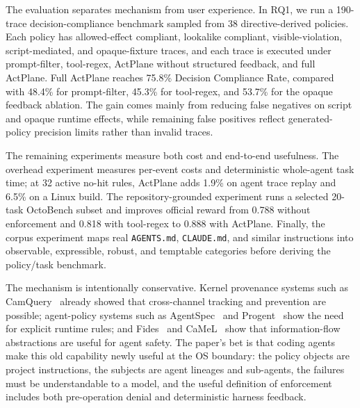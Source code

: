 \documentclass[sigplan,10pt]{acmart}
\begin{document}
The evaluation separates mechanism from user experience. In RQ1, we run a
190-trace decision-compliance benchmark sampled from 38 directive-derived policies. Each
policy has allowed-effect compliant, lookalike compliant, visible-violation,
script-mediated, and opaque-fixture traces, and each trace is executed under
prompt-filter, tool-regex, ActPlane without structured feedback, and full
ActPlane. Full ActPlane reaches 75.8\% Decision Compliance Rate, compared
with 48.4\% for prompt-filter, 45.3\% for tool-regex, and 53.7\% for the opaque
feedback ablation. The gain comes mainly from reducing false negatives on
script and opaque runtime effects, while remaining false positives reflect
generated-policy precision limits rather than invalid traces.

The remaining experiments measure both cost and end-to-end usefulness. The
overhead experiment measures per-event costs and deterministic whole-agent task
time; at 32 active no-hit rules, ActPlane adds 1.9\% on agent trace replay and
6.5\% on a Linux build. The repository-grounded experiment runs a selected
20-task OctoBench subset and improves official reward from 0.788 without
enforcement and 0.818 with tool-regex to 0.888 with ActPlane. Finally, the
corpus experiment maps real \texttt{AGENTS.md}, \texttt{CLAUDE.md}, and similar
instructions into observable, expressible, robust, and temptable categories
before deriving the policy/task benchmark.

The mechanism is intentionally conservative. Kernel provenance systems such as
CamQuery~\cite{pasquier2018camquery} already showed that cross-channel tracking
and prevention are possible; agent-policy systems such as
AgentSpec~\cite{wang2025agentspec} and Progent~\cite{shi2025progent} show the
need for explicit runtime rules; and Fides~\cite{costa2025fides} and
CaMeL~\cite{debenedetti2025camel} show that information-flow abstractions are
useful for agent safety. The paper's bet is that coding agents make this old
capability newly useful at the OS boundary: the policy objects are project
instructions, the subjects are agent lineages and sub-agents, the failures must
be understandable to a model, and the useful definition of enforcement includes
both pre-operation denial and deterministic harness feedback.



\end{document}
